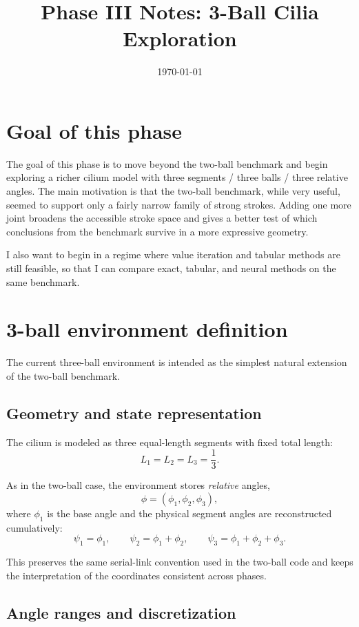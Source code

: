 \documentclass{article}
\title{Phase III Notes: 3-Ball Cilia Exploration}
\date{\today}
\begin{document}
\maketitle

\section{Goal of this phase}

The goal of this phase is to move beyond the two-ball benchmark and begin exploring a richer cilium model with three segments / three balls / three relative angles. The main motivation is that the two-ball benchmark, while very useful, seemed to support only a fairly narrow family of strong strokes. Adding one more joint broadens the accessible stroke space and gives a better test of which conclusions from the benchmark survive in a more expressive geometry.

I also want to begin in a regime where value iteration and tabular methods are still feasible, so that I can compare exact, tabular, and neural methods on the same benchmark.

\section{3-ball environment definition}

The current three-ball environment is intended as the simplest natural extension of the two-ball benchmark.

\subsection*{Geometry and state representation}

The cilium is modeled as three equal-length segments with fixed total length:
\[
L_1=L_2=L_3=\frac13.
\]

As in the two-ball case, the environment stores \emph{relative} angles,
\[
\phi = (\phi_1,\phi_2,\phi_3),
\]
where $\phi_1$ is the base angle and the physical segment angles are reconstructed cumulatively:
\[
\psi_1=\phi_1,\qquad
\psi_2=\phi_1+\phi_2,\qquad
\psi_3=\phi_1+\phi_2+\phi_3.
\]

This preserves the same serial-link convention used in the two-ball code and keeps the interpretation of the coordinates consistent across phases.

\subsection*{Angle ranges and discretization}
\end{document}
